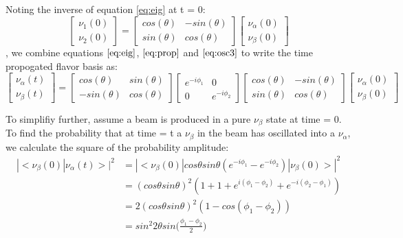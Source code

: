 \documentclass[12pt]{article}
\begin{document}
\noindent Noting the inverse of equation \ref{eq:eig} at t = 0:
\begin{equation} \label{eq:osc3}
 \begin{bmatrix}
 \nu_1(0)
 \\ \nu_2(0)
 \end{bmatrix}
 = \begin{bmatrix}
cos(\theta) & -sin(\theta)
\\ sin(\theta)& cos(\theta)
\end{bmatrix} 
 \begin{bmatrix}
 \nu_\alpha(0)
 \\ \nu_\beta(0)
 \end{bmatrix}
\end{equation},
we combine equations $\ref{eq:eig}$, $\ref{eq:prop}$ and $\ref{eq:osc3}$ to write the time propogated flavor basis as:
\begin{equation} \label{eq:osc4}
 \begin{bmatrix}
 \nu_\alpha(t)
 \\ \nu_\beta(t)
 \end{bmatrix}
 = \begin{bmatrix}
cos(\theta) & sin(\theta)
\\ -sin(\theta)& cos(\theta)
\end{bmatrix} 
  \begin{bmatrix}
 e^{-i\phi_1} & 0
\\ 0 & e^{-i\phi_2}
  \end{bmatrix}
\begin{bmatrix}
cos(\theta) & -sin(\theta)
\\ sin(\theta)& cos(\theta)
\end{bmatrix}
\begin{bmatrix}
\nu_\alpha(0)
\\ \nu_\beta(0) 
\end{bmatrix}
\end{equation}

\noindent To simplifiy further, assume a beam is produced in a pure $\nu_\beta$ state at time = 0. To find the probability that at time = t a $\nu_\beta$ in the beam has oscillated into a $\nu_\alpha$, we calculate the square of the probability amplitude:
\begin{equation} \label{eq:osc5}
\begin{split}
 |<\nu_\beta(0)|\nu_\alpha(t)>|^2 &= |<\nu_\beta(0)|cos\theta sin\theta(e^{-i\phi_1}-e^{-i\phi_2})|\nu_\beta(0)>|^2
\\&= (cos\theta sin\theta)^2(1+1+e^{i(\phi_1-\phi_2)} + e^{-i(\phi_2-\phi_1)})
\\&= 2(cos\theta sin\theta)^2(1-cos(\phi_1-\phi_2))
\\&= sin^2 2\theta sin\big(\frac{\phi_1-\phi_2}{2}\big)
\end{split}
 \end{equation}
\end{document}
